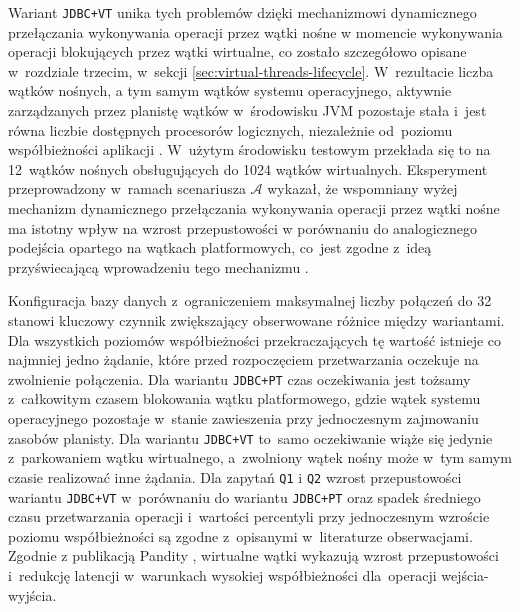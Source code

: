 Wariant \texttt{JDBC+VT} unika tych problemów dzięki mechanizmowi dynamicznego przełączania wykonywania operacji przez wątki nośne w momencie wykonywania operacji blokujących przez wątki wirtualne, co zostało szczegółowo opisane w~rozdziale trzecim, w~sekcji \ref{sec:virtual-threads-lifecycle}.
W~rezultacie liczba wątków nośnych, a tym samym wątków systemu operacyjnego, aktywnie zarządzanych przez planistę wątków w~środowisku JVM pozostaje stała i~jest równa liczbie dostępnych procesorów logicznych, niezależnie od~poziomu współbieżności aplikacji \cite{veen2024, openjdk-loom-proposal}.
W~użytym środowisku testowym przekłada się to na 12~wątków nośnych obsługujących do 1024 wątków wirtualnych. Eksperyment przeprowadzony w~ramach scenariusza $\mathcal{A}$ wykazał, że wspomniany wyżej mechanizm dynamicznego przełączania wykonywania operacji przez wątki nośne ma istotny wpływ na wzrost przepustowości w porównaniu do analogicznego podejścia opartego na wątkach platformowych, co~jest zgodne z~ideą przyświecającą wprowadzeniu tego mechanizmu \cite{jep444}.

Konfiguracja bazy danych z~ograniczeniem maksymalnej liczby połączeń do 32 stanowi kluczowy czynnik zwiększający obserwowane różnice między wariantami. Dla wszystkich poziomów współbieżności przekraczających tę wartość istnieje co najmniej jedno żądanie, które przed rozpoczęciem przetwarzania oczekuje na zwolnienie połączenia.
Dla wariantu \texttt{JDBC+PT} czas oczekiwania jest tożsamy z~całkowitym czasem blokowania wątku platformowego, gdzie wątek systemu operacyjnego pozostaje w~stanie zawieszenia przy jednoczesnym zajmowaniu zasobów planisty. Dla wariantu \texttt{JDBC+VT} to~samo oczekiwanie wiąże się jedynie z~parkowaniem wątku wirtualnego, a~zwolniony wątek nośny może w~tym samym czasie realizować inne żądania.
Dla zapytań \texttt{Q1} i \texttt{Q2} wzrost przepustowości wariantu \texttt{JDBC+VT} w~porównaniu do wariantu \texttt{JDBC+PT} oraz spadek średniego czasu przetwarzania operacji i~wartości percentyli przy jednoczesnym wzroście poziomu współbieżności są zgodne z~opisanymi w~literaturze obserwacjami. Zgodnie z publikacją Pandity \cite{pandita2024}, wirtualne wątki wykazują wzrost przepustowości i~redukcję latencji w~warunkach wysokiej współbieżności dla~operacji wejścia-wyjścia.

